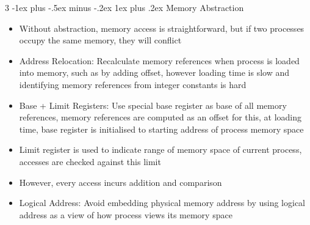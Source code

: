 \documentclass[10pt, landscape]{article}
\makeatletter
\renewcommand{\subsection}{\@startsection{subsection}{3}{0mm}%
                                {-1ex plus -.5ex minus -.2ex}%
                                {1ex plus .2ex}%
                                {\normalfont\small\bfseries}}%
\makeatother
\begin{document}
\begin{multicols*}{3}
\subsection{Memory Abstraction}
\begin{itemize}
    \item Without abstraction, memory access is straightforward, but if two processes occupy the same memory, they will conflict
    \item Address Relocation: Recalculate memory references when process is loaded into memory, such as by adding offset, however loading time is slow and identifying memory references from integer constants is hard
    \item Base + Limit Registers: Use special base register as base of all memory references, memory references are computed as an offset for this, at loading time, base register is initialised to starting address of process memory space
    \item Limit register is used to indicate range of memory space of current process, accesses are checked against this limit
    \item However, every access incurs addition and comparison
    \item Logical Address: Avoid embedding physical memory address by using logical address as a view of how process views its memory space
\end{itemize}


\end{multicols*}
\end{document}

